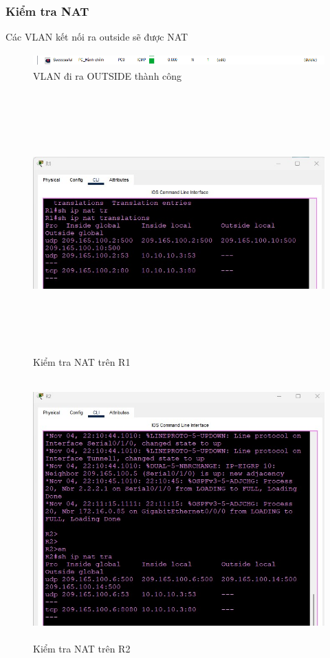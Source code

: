 \documentclass[a4paper, 12pt]{article}
\begin{document}
\subsubsection{Kiểm tra NAT}
\hspace*{0.25cm}Các VLAN kết nối ra outside sẽ được NAT\\
\begin{figure}[H]
    \centering
    \includegraphics[width=16cm, height=0.5cm]{img/natout.png}
    \caption{VLAN đi ra OUTSIDE thành công}
    \label{nat1}
\end{figure}
\begin{figure}[H]
    \centering
    \includegraphics[width=16cm, height=10cm]{img/nat1.png}
    \caption{Kiểm tra NAT trên R1}
    \label{nat1}
\end{figure}
\begin{figure}[H]
    \centering
    \includegraphics[width=16cm, height=10cm]{img/nat2.jpg}
    \caption{Kiểm tra NAT trên R2}
    \label{nat2}
\end{figure}
\end{document}
